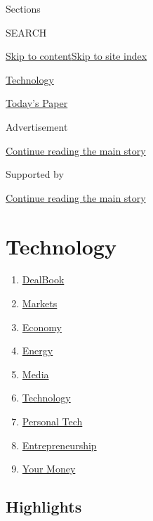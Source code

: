 Sections

SEARCH

\protect\hyperlink{site-content}{Skip to
content}\protect\hyperlink{site-index}{Skip to site index}

\href{https://www.nytimes3xbfgragh.onion/section/technology}{Technology}

\href{https://myaccount.nytimes3xbfgragh.onion/auth/login?response_type=cookie\&client_id=vi}{}

\href{https://www.nytimes3xbfgragh.onion/section/todayspaper}{Today's
Paper}

Advertisement

\protect\hyperlink{after-top}{Continue reading the main story}

Supported by

\protect\hyperlink{after-sponsor}{Continue reading the main story}

\hypertarget{technology}{%
\section{Technology}\label{technology}}

\begin{enumerate}
\def\labelenumi{\arabic{enumi}.}
\tightlist
\item
  \href{/pages/business/dealbook/index.html}{DealBook}
\item
  \href{https://markets.on.nytimes3xbfgragh.onion}{Markets}
\item
  \href{/section/business/economy}{Economy}
\item
  \href{/section/business/energy-environment}{Energy}
\item
  \href{/section/business/media}{Media}
\item
  \href{/section/technology}{Technology}
\item
  \href{/section/technology/personaltech}{Personal Tech}
\item
  \href{/section/business/smallbusiness}{Entrepreneurship}
\item
  \href{/section/your-money}{Your Money}
\end{enumerate}

\hypertarget{highlights}{%
\subsection{Highlights}\label{highlights}}

